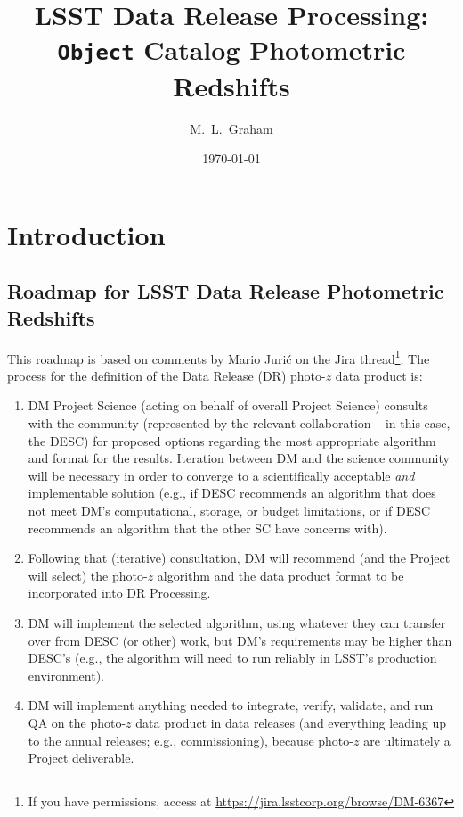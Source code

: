 \documentclass[DM,lsstdraft,toc]{lsstdoc}
\title[LSST Photo-$z$]{LSST Data Release Processing: \\ {\tt Object} Catalog Photometric Redshifts}
\author{M.~L.~Graham}
\date{\today}
\begin{document}
\maketitle




\section{Introduction} \label{sec:intro}

\subsection{Roadmap for LSST Data Release Photometric Redshifts}\label{ssec:intro_roadmap}

This roadmap is based on comments by Mario Juri\'{c} on the Jira thread\footnote{If you have permissions, access at \url{https://jira.lsstcorp.org/browse/DM-6367}}. The process for the definition of the Data Release (DR) photo-$z$ data product is:
\begin{enumerate}
\item DM Project Science (acting on behalf of overall Project Science) consults with the community (represented by the relevant collaboration -- in this case, the DESC) for proposed options regarding the most appropriate algorithm and format for the results. Iteration between DM and the science community will be necessary in order to converge to a scientifically acceptable {\it and} implementable solution (e.g., if DESC recommends an algorithm that does not meet DM's computational, storage, or budget limitations, or if DESC recommends an algorithm that the other SC have concerns with).
\item Following that (iterative) consultation, DM will recommend (and the Project will select) the photo-$z$ algorithm and the data product format to be incorporated into DR Processing.
\item DM will implement the selected algorithm, using whatever they can transfer over from DESC (or other) work, but DM's requirements may be higher than DESC's (e.g., the algorithm will need to run reliably in LSST's production environment).
\item DM will implement anything needed to integrate, verify, validate, and run QA on the photo-$z$ data product in data releases (and everything leading up to the annual releases; e.g., commissioning), because photo-$z$ are ultimately a Project deliverable.
\end{enumerate}
\end{document}
